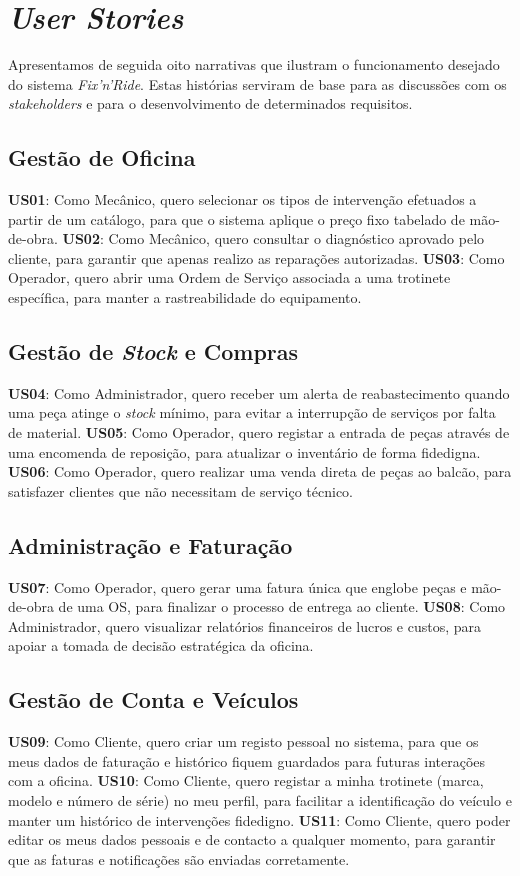 \documentclass[a4paper,12pt]{scrreprt}
\begin{document}
\section{\textit{User Stories}}
Apresentamos de seguida oito narrativas que ilustram o funcionamento desejado do sistema \textit{Fix'n'Ride}. Estas histórias serviram de base para as discussões com os \textit{stakeholders} e para o desenvolvimento de determinados requisitos. 

\subsection{Gestão de Oficina}
\textbf{US01}: Como Mecânico, quero selecionar os tipos de intervenção efetuados a partir de um catálogo, para que o sistema aplique o preço fixo tabelado de mão-de-obra. \textbf{US02}: Como Mecânico, quero consultar o diagnóstico aprovado pelo cliente, para garantir que apenas realizo as reparações autorizadas. \textbf{US03}: Como Operador, quero abrir uma Ordem de Serviço associada a uma trotinete específica, para manter a rastreabilidade do equipamento. 

\subsection{Gestão de \textit{Stock} e Compras}
\textbf{US04}: Como Administrador, quero receber um alerta de reabastecimento quando uma peça atinge o \textit{stock} mínimo, para evitar a interrupção de serviços por falta de material. \textbf{US05}: Como Operador, quero registar a entrada de peças através de uma encomenda de reposição, para atualizar o inventário de forma fidedigna. \textbf{US06}: Como Operador, quero realizar uma venda direta de peças ao balcão, para satisfazer clientes que não necessitam de serviço técnico. 

\subsection{Administração e Faturação}
\textbf{US07}: Como Operador, quero gerar uma fatura única que englobe peças e mão-de-obra de uma OS, para finalizar o processo de entrega ao cliente. \textbf{US08}: Como Administrador, quero visualizar relatórios financeiros de lucros e custos, para apoiar a tomada de decisão estratégica da oficina. 

\subsection{Gestão de Conta e Veículos}
\textbf{US09}: Como Cliente, quero criar um registo pessoal no sistema, para que os meus dados de faturação e histórico fiquem guardados para futuras interações com a oficina. \textbf{US10}: Como Cliente, quero registar a minha trotinete (marca, modelo e número de série) no meu perfil, para facilitar a identificação do veículo e manter um histórico de intervenções fidedigno. \textbf{US11}: Como Cliente, quero poder editar os meus dados pessoais e de contacto a qualquer momento, para garantir que as faturas e notificações são enviadas corretamente. 
\end{document}

